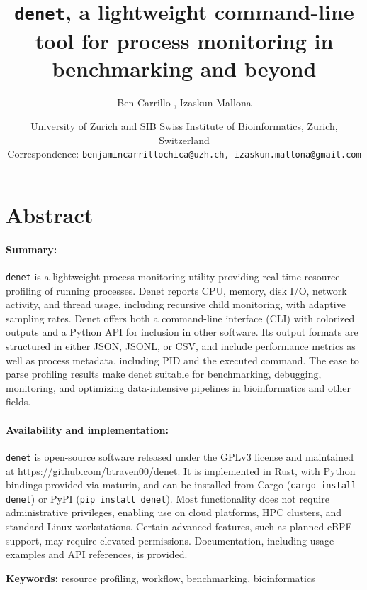 \documentclass[10pt]{article}
\title{\texttt{denet}, a lightweight command-line tool for process monitoring in benchmarking and beyond}
\author{Ben Carrillo \orcidlink{0009-0003-5704-4151}, Izaskun Mallona \orcidlink{0000-0002-2853-7526}}
\date{
	University of Zurich and SIB Swiss Institute of Bioinformatics, Zurich, Switzerland \\ Correspondence: \texttt{benjamincarrillochica@uzh.ch, izaskun.mallona@gmail.com}\\%
}
\begin{document}
\maketitle
	
\section*{Abstract} %

\paragraph{Summary:} \texttt{denet} is a lightweight process monitoring utility providing real-time resource profiling of running processes. Denet reports CPU, memory, disk I/O, network activity, and thread usage, including recursive child monitoring, with adaptive sampling rates. Denet offers both a command-line interface (CLI) with colorized outputs and a Python API for inclusion in other software. Its output formats are structured in either JSON, JSONL, or CSV, and include performance metrics as well as process metadata, including PID and the executed command. The ease to parse profiling results make denet suitable for benchmarking, debugging, monitoring, and optimizing data-intensive pipelines in bioinformatics and other fields. 

\paragraph{Availability and implementation:} \texttt{denet} is open-source software released under the GPLv3 license and maintained at \url{https://github.com/btraven00/denet}. It is implemented in Rust, with Python bindings provided via maturin, and can be installed from Cargo (\texttt{cargo install denet}) or PyPI (\texttt{pip install denet}). Most functionality does not require administrative privileges, enabling use on cloud platforms, HPC clusters, and standard Linux workstations. Certain advanced features, such as planned eBPF support, may require elevated permissions. Documentation, including usage examples and API references, is provided.

\vspace{1cm}

\noindent\textbf{Keywords:} resource profiling, workflow, benchmarking, bioinformatics

\clearpage
\end{document}
